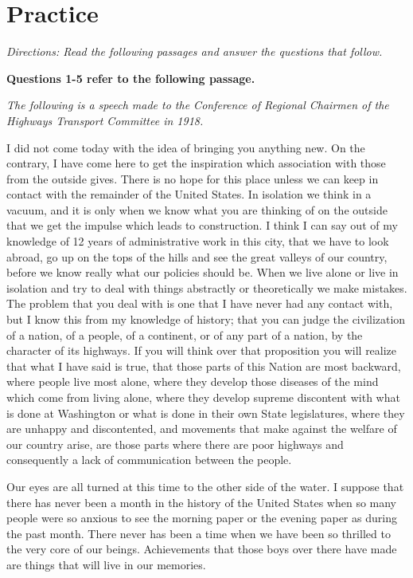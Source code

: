 \section{Practice}

\textit{Directions: Read the following passages and answer the questions that follow.}

\bigskip
\textbf{Questions 1-5 refer to the following passage.}

\bigskip

\textit{The following is a speech made to the Conference of Regional Chairmen of the Highways Transport Committee in 1918.}

\begin{linenumbers*}
\modulolinenumbers[5]
\indent I did not come today with the idea of bringing you anything new. On the contrary, I have come here to get the inspiration which association with those from the outside gives. There is no hope for this place unless we can keep in contact with the remainder of the United States. In isolation we think in a vacuum, and it is only when we know what you are thinking of on the outside that we get the impulse which leads to construction. I think I can say out of my knowledge of 12 years of administrative work in this city, that we have to look abroad, go up on the tops of the hills and see the great valleys of our country, before we know really what our policies should be. When we live alone or live in isolation and try to deal with things abstractly or theoretically we make mistakes.
The problem that you deal with is one that I have never had any contact with, but I know this from my knowledge of history; that you can judge the civilization of a nation, of a people, of a continent, or of any part of a nation, by the character of its highways. If you will think over that proposition you will realize that what I have said is true, that those parts of this Nation are most backward, where people live most alone, where they develop those diseases of the mind which come from living alone, where they develop supreme discontent with what is done at Washington or what is done in their own State legislatures, where they are unhappy and discontented, and movements that make against the welfare of our country arise, are those parts where there are poor highways and consequently a lack of communication between the people.

\indent Our eyes are all turned at this time to the other side of the water. I suppose that there has never been a month in the history of the United States when so many people were so anxious to see the morning paper or the evening paper as during the past month. There never has been a time when we have been so thrilled to the very core of our beings. Achievements that those boys over there have made are things that will live in our memories.


\end{linenumbers*}
